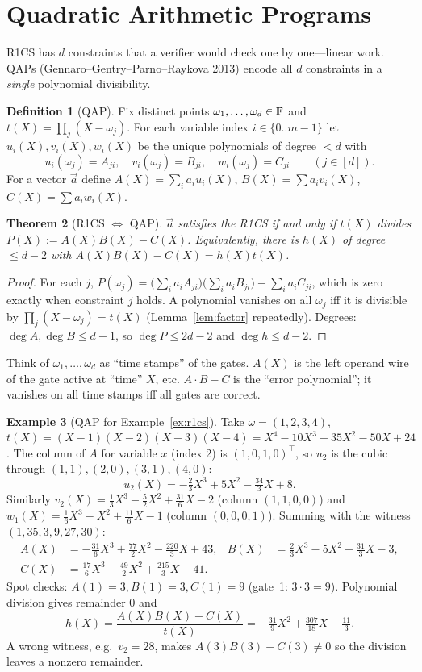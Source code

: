 \documentclass[11pt,a4paper]{report}
\theoremstyle{plain}
\newtheorem{theorem}{Theorem}[chapter]
\theoremstyle{definition}
\newtheorem{definition}[theorem]{Definition}
\newtheorem{example}[theorem]{Example}
\theoremstyle{remark}
\begin{document}
\section{Quadratic Arithmetic Programs}
R1CS has $d$ constraints that a verifier would check one by one---linear work. QAPs (Gennaro--Gentry--Parno--Raykova 2013) encode all $d$ constraints in a \emph{single} polynomial divisibility.
\begin{definition}[QAP]\label{def:qap}
Fix distinct points $\omega_1,\dots,\omega_d\in\mathbb{F}$ and $t(X)=\prod_j(X-\omega_j)$. For each variable index $i\in\{0..m-1\}$ let $u_i(X),v_i(X),w_i(X)$ be the unique polynomials of degree $<d$ with
\[u_i(\omega_j)=A_{ji},\quad v_i(\omega_j)=B_{ji},\quad w_i(\omega_j)=C_{ji}\qquad(j\in[d]).\]
For a vector $\vec a$ define $A(X)=\sum_ia_iu_i(X)$, $B(X)=\sum a_iv_i(X)$, $C(X)=\sum a_iw_i(X)$.
\end{definition}
\begin{theorem}[R1CS $\Leftrightarrow$ QAP]\label{thm:qap}
$\vec a$ satisfies the R1CS if and only if $t(X)$ divides $P(X):=A(X)B(X)-C(X)$. Equivalently, there is $h(X)$ of degree $\le d-2$ with $A(X)B(X)-C(X)=h(X)t(X)$.
\end{theorem}
\begin{proof}
For each $j$, $P(\omega_j)=\big(\sum_ia_iA_{ji}\big)\big(\sum_ia_iB_{ji}\big)-\sum_ia_iC_{ji}$, which is zero exactly when constraint $j$ holds. A polynomial vanishes on all $\omega_j$ iff it is divisible by $\prod_j(X-\omega_j)=t(X)$ (Lemma~\ref{lem:factor} repeatedly). Degrees: $\deg A,\deg B\le d-1$, so $\deg P\le2d-2$ and $\deg h\le d-2$.
\end{proof}
\begin{intuition}
Think of $\omega_1,\dots,\omega_d$ as ``time stamps'' of the gates. $A(X)$ is the left operand wire of the gate active at ``time'' $X$, etc. $A\cdot B-C$ is the ``error polynomial''; it vanishes on all time stamps iff all gates are correct.
\end{intuition}
\begin{example}[QAP for Example~\ref{ex:r1cs}]
Take $\omega=(1,2,3,4)$, $t(X)=(X-1)(X-2)(X-3)(X-4)=X^4-10X^3+35X^2-50X+24$. The column of $A$ for variable $x$ (index 2) is $(1,0,1,0)^\top$, so $u_2$ is the cubic through $(1,1),(2,0),(3,1),(4,0)$:
\[u_2(X)=-\tfrac23X^3+5X^2-\tfrac{34}3X+8.\]
Similarly $v_2(X)=\tfrac13X^3-\tfrac52X^2+\tfrac{31}6X-2$ (column $(1,1,0,0)$) and $w_1(X)=\tfrac16X^3-X^2+\tfrac{11}6X-1$ (column $(0,0,0,1)$). Summing with the witness $(1,35,3,9,27,30)$:
\begin{align*}
A(X)&=-\tfrac{31}{6}X^3+\tfrac{77}{2}X^2-\tfrac{220}{3}X+43, & B(X)&=\tfrac23X^3-5X^2+\tfrac{31}3X-3,\\
C(X)&=\tfrac{17}{6}X^3-\tfrac{49}{2}X^2+\tfrac{215}3X-41.
\end{align*}
Spot checks: $A(1)=3,B(1)=3,C(1)=9$ (gate~1: $3\cdot3=9$). Polynomial division gives remainder $0$ and
\[h(X)=\frac{A(X)B(X)-C(X)}{t(X)}=-\tfrac{31}{9}X^2+\tfrac{307}{18}X-\tfrac{11}{3}.\]
A wrong witness, e.g.\ $v_2=28$, makes $A(3)B(3)-C(3)\ne0$ so the division leaves a nonzero remainder.
\end{example}
\end{document}
